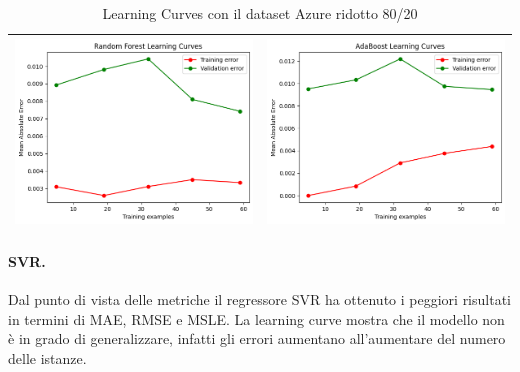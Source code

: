 \begin{table}[H]
\begin{tabularx}{\textwidth}{|X|X|}
        \includegraphics[width=\linewidth, trim=0 0 0 0]{images/RandomForest_lc80_ridottoAzure.png} &
        \includegraphics[width=\linewidth, trim=0 0 0 0]{images/AdaBoost_lc80_ridottoAzure.png} \\
        \hline
    \end{tabularx}
    \caption{Learning Curves con il dataset Azure ridotto 80/20}
    \label{tab:emissions_info}
\end{table}

\paragraph{\textbf{SVR}.}
Dal punto di vista delle metriche il regressore SVR ha ottenuto i peggiori risultati in termini di MAE, RMSE e MSLE. La learning curve mostra che il modello non è in grado di generalizzare, infatti gli errori aumentano all'aumentare del numero delle istanze.

